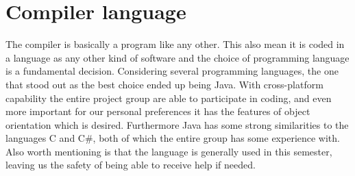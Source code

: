 \section{Compiler language}
The compiler is basically a program like any other. This also mean it is coded in a language as any other kind of software and the choice of programming language is a fundamental decision. Considering several programming languages, the one that stood out as the best choice ended up being Java. With cross-platform capability the entire project group are able to participate in coding, and even more important for our personal preferences it has the features of object orientation which is desired. Furthermore Java has some strong similarities to the languages C and C\#, both of which the entire group has some experience with. Also worth mentioning is that the language is generally used in this semester, leaving us the safety of being able to receive help if needed.